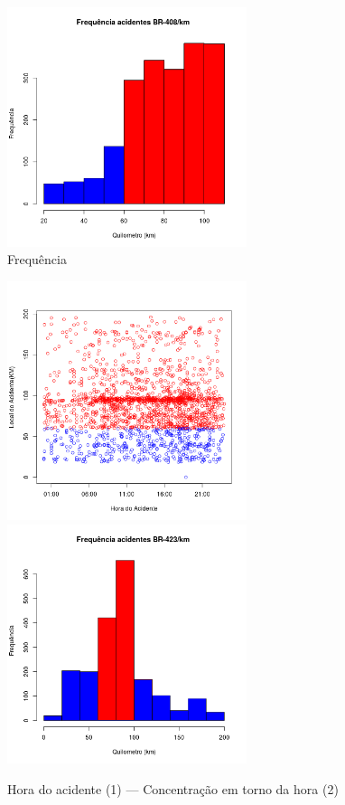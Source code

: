 \quad \quad
\begin{figure}[h]
	\centering
	\caption{ Frequência}
	\includegraphics[width=7cm,height=7cm]{Figuras/Preprocess/br408_3.png}
\end{figure}


\pagebreak

\begin{figure}[h]
	\caption{Hora do acidente (1) --- Concentração em torno da hora (2)}
	\includegraphics[width=7cm,height=7cm]{Figuras/Preprocess/br423_1.png}
	\includegraphics[width=7cm,height=7cm]{Figuras/Preprocess/br423_2.png}
	
\end{figure}

